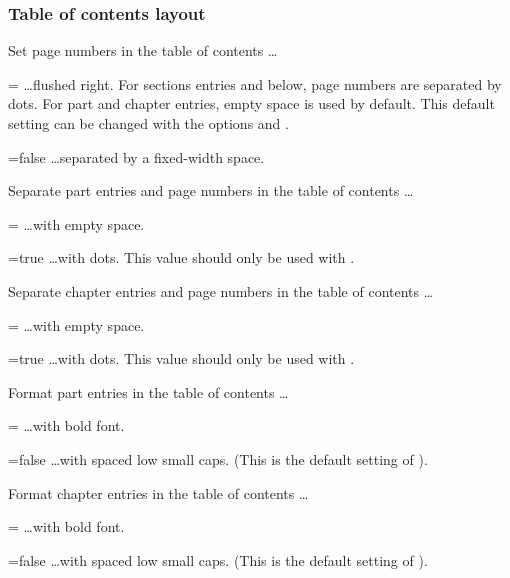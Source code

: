 \subsubsection{Table of contents layout}
\label{sec:toc-layout}
   
\begin{optionlist}
   \opt[dottedtoc] Set page numbers in the table of contents \dots
   \begin{valuelist}
      \item[=\optionvaluedefaultfont{true}] \dots flushed right. For sections entries and below, page numbers are separated by dots. For part and chapter entries, empty space is used by default. This default setting can be changed with the options  and .
      \item[=false] \dots separated by a fixed-width space.
   \end{valuelist}
   
   \opt[dottedtocparts] Separate part entries and page numbers in the table of contents \dots
   \begin{valuelist}
      \item[=\optionvaluedefaultfont{false}] \dots with empty space.
      \item[=true] \dots with dots. This value should only be used with .
   \end{valuelist}
   
   \opt[dottedtocchapters] Separate chapter entries and page numbers in the table of contents \dots
   \begin{valuelist}
      \item[=\optionvaluedefaultfont{false}] \dots with empty space.
      \item[=true] \dots with dots. This value should only be used with .
   \end{valuelist}
   
   \opt[tocpartentriesbold] Format part entries in the table of contents \dots
   \begin{valuelist}
      \item[=\optionvaluedefaultfont{true}] \dots with bold font.
      \item[=false] \dots with spaced low small caps. (This is the default setting of ). 
   \end{valuelist}
   
   \opt[tocchapterentriesbold] Format chapter entries in the table of contents \dots
   \begin{valuelist}
      \item[=\optionvaluedefaultfont{true}] \dots with bold font.
      \item[=false] \dots with spaced low small caps. (This is the default setting of ). 
   \end{valuelist}
   

\end{optionlist}
